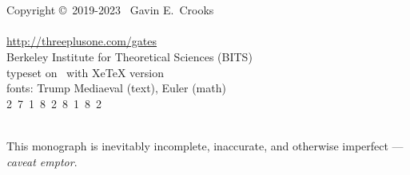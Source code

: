 

~
\vfill
{\center
~\\~\\
Copyright \copyright~2019-2023~ Gavin E.\ Crooks~\\
~ %
\\
\url{http://threeplusone.com/gates} 
\\
Berkeley Institute for Theoretical Sciences (BITS)
\\
typeset on \isotoday~with XeTeX version \the\XeTeXversion\XeTeXrevision
\\
fonts: Trump Mediaeval (text), Euler (math)
\\
  2~7~1~8~2~8~1~8~2
\\
~ 
\\
}

This monograph is inevitably incomplete, inaccurate, and otherwise imperfect --- \emph{caveat emptor}.
